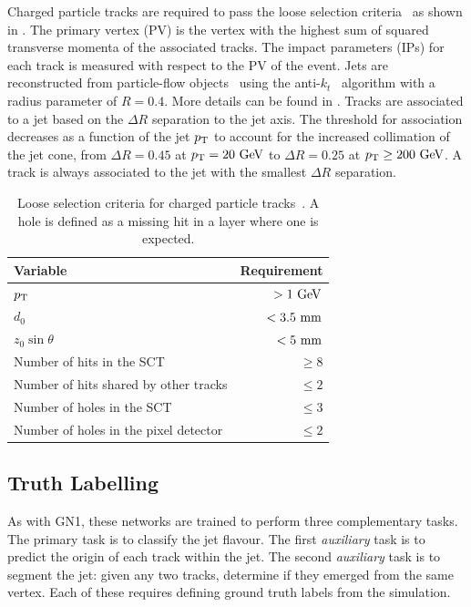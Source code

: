 Charged particle tracks are required to pass the loose selection criteria~\cite{DL1D} as shown in .
The primary vertex (PV) is the vertex with the highest sum of squared transverse momenta of the associated tracks.
The impact parameters (IPs) for each track is measured with respect to the PV of the event.
Jets are reconstructed from particle-flow objects~\cite{PFlow} using the anti-$k_t$~\cite{AntiKt} algorithm with a radius parameter of $R = 0.4$.
More details can be found in .
Tracks are associated to a jet based on the $\Delta R$ separation to the jet axis.
The threshold for association decreases as a function of the jet $p_\mathrm{T}$ to account for the increased collimation of the jet cone, from $\Delta R = 0.45$ at $\pt = 20~\GeV$ to $\Delta R = 0.25$ at $\pt \geq 200~\GeV$.
A track is always associated to the jet with the smallest $\Delta R$ separation.

\begin{table}
    \centering
    \begin{tabular}{lr}
        \toprule
        Variable                              & Requirement \\
        \midrule
        $p_\mathrm{T}$                                 & $> 1~\GeV$  \\
        $d_0$                                 & $< 3.5~\mm$ \\
        $z_0 \sin \theta$                     & $< 5~\mm$   \\
        Number of hits in the SCT             & $\geq 8$    \\
        Number of hits shared by other tracks & $\leq 2$    \\
        Number of holes in the SCT            & $\leq 3$    \\
        Number of holes in the pixel detector & $\leq 2$    \\
        \bottomrule
    \end{tabular}
    \caption{Loose selection criteria for charged particle tracks~\cite{DL1D}. A hole is defined as a missing hit in a layer where one is expected.}
    \label{tab:track_loose}
\end{table}

\subsection{Truth Labelling}

As with GN1, these networks are trained to perform three complementary tasks.
The primary task is to classify the jet flavour.
The first \textit{auxiliary} task is to predict the origin of each track within the jet.
The second \textit{auxiliary} task is to segment the jet: given any two tracks, determine if they emerged from the same vertex.
Each of these requires defining ground truth labels from the simulation.

